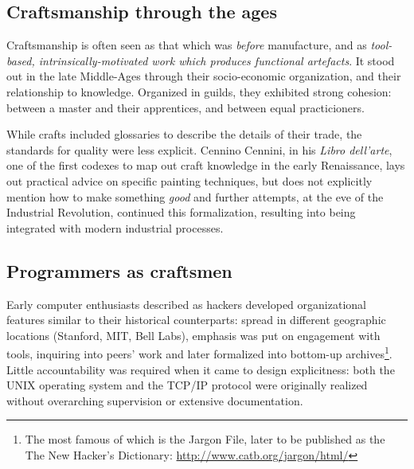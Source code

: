 \documentclass{article}
\begin{document}
\subsection{Craftsmanship through the ages}

Craftsmanship is often seen as that which was \emph{before} manufacture, and as \emph{tool-based, intrinsically-motivated work which produces functional artefacts}\cite{sennett_craftsman_2009}. It stood out in the late Middle-Ages through their socio-economic organization, and their relationship to knowledge. Organized in guilds, they exhibited strong cohesion: between a master and their apprentices, and between equal practicioners\cite{black_guilds_1984,wolek_managerial_1999}.

While crafts included glossaries to describe the details of their trade\cite{bassett_craftsman_2008}, the standards for quality were less explicit. Cennino Cennini, in his \emph{Libro dell'arte}, one of the first codexes to map out craft knowledge in the early Renaissance, lays out practical advice on specific painting techniques, but does not explicitly mention how to make something \emph{good}\cite{cennini_craftsmans_2012} and further attempts, at the eve of the Industrial Revolution, continued this formalization\cite{pannabecker_diderot_1994}, resulting into being integrated with modern industrial processes\cite{gordon_who_1988,mcgee_craftsmanship_1999}.

\subsection{Programmers as craftsmen}

Early computer enthusiasts described as hackers developed organizational features similar to their historical counterparts: spread in different geographic locations (Stanford, MIT, Bell Labs)\cite{raymond_cathedral_2001}, emphasis was put on engagement with tools\cite{stephenson_beginningwas_1999}, inquiring into peers' work\cite{levy_hackers_2010} and later formalized into bottom-up archives\footnote{The most famous of which is the Jargon File, later to be published as the The New Hacker's Dictionary: \url{http://www.catb.org/jargon/html/}}. Little accountability was required when it came to design explicitness: both the UNIX operating system and the TCP/IP protocol were originally realized without overarching supervision or extensive documentation\cite{seibel_coders_2009,raymond_cathedral_2001}.
\end{document}
